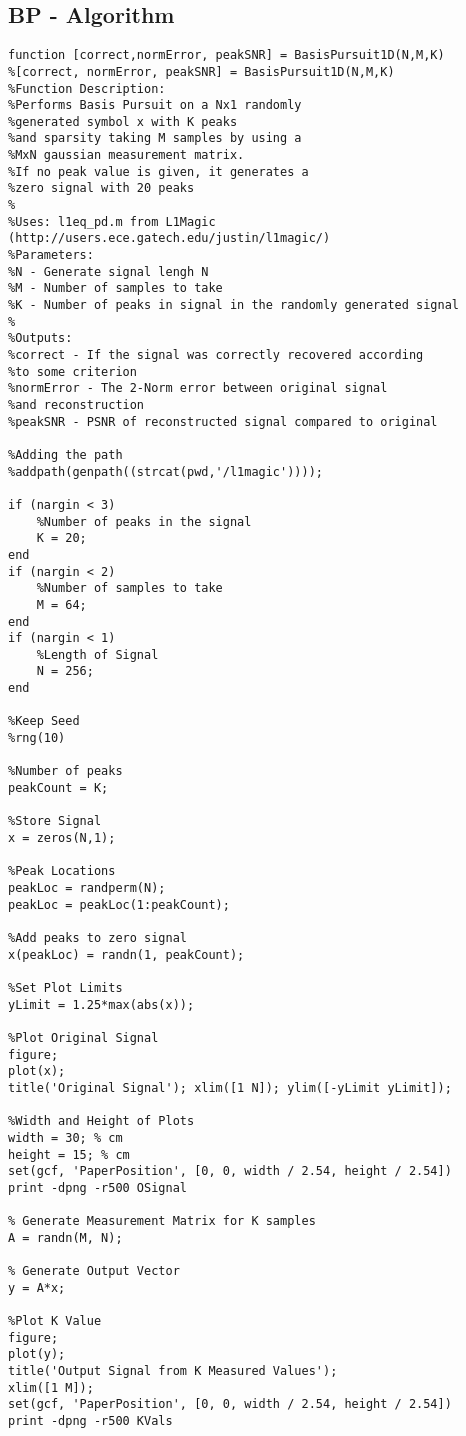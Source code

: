\documentclass[titlepage,oneside, 12pt]{book}
\theoremstyle{break}
\begin{document}
\begin{appendices}
\chapter{BP - Algorithm}

\begin{lstlisting}[label={lst:ex1D}]
function [correct,normError, peakSNR] = BasisPursuit1D(N,M,K)
%[correct, normError, peakSNR] = BasisPursuit1D(N,M,K)
%Function Description: 
%Performs Basis Pursuit on a Nx1 randomly 
%generated symbol x with K peaks 
%and sparsity taking M samples by using a 
%MxN gaussian measurement matrix. 
%If no peak value is given, it generates a 
%zero signal with 20 peaks
%
%Uses: l1eq_pd.m from L1Magic 
(http://users.ece.gatech.edu/justin/l1magic/)
%Parameters:
%N - Generate signal lengh N
%M - Number of samples to take
%K - Number of peaks in signal in the randomly generated signal
%
%Outputs:
%correct - If the signal was correctly recovered according
%to some criterion
%normError - The 2-Norm error between original signal 
%and reconstruction
%peakSNR - PSNR of reconstructed signal compared to original

%Adding the path
%addpath(genpath((strcat(pwd,'/l1magic'))));

if (nargin < 3)
    %Number of peaks in the signal 
    K = 20;
end
if (nargin < 2)
    %Number of samples to take
    M = 64;
end
if (nargin < 1)
    %Length of Signal 
    N = 256;
end

%Keep Seed
%rng(10)

%Number of peaks
peakCount = K; 

%Store Signal
x = zeros(N,1);

%Peak Locations
peakLoc = randperm(N);
peakLoc = peakLoc(1:peakCount); 

%Add peaks to zero signal
x(peakLoc) = randn(1, peakCount);

%Set Plot Limits
yLimit = 1.25*max(abs(x)); 

%Plot Original Signal
figure; 
plot(x); 
title('Original Signal'); xlim([1 N]); ylim([-yLimit yLimit]);

%Width and Height of Plots
width = 30; % cm 
height = 15; % cm
set(gcf, 'PaperPosition', [0, 0, width / 2.54, height / 2.54])
print -dpng -r500 OSignal

% Generate Measurement Matrix for K samples
A = randn(M, N);

% Generate Output Vector
y = A*x;

%Plot K Value
figure; 
plot(y); 
title('Output Signal from K Measured Values');
xlim([1 M]);
set(gcf, 'PaperPosition', [0, 0, width / 2.54, height / 2.54])
print -dpng -r500 KVals


\end{lstlisting}
\end{appendices}
\end{document}
